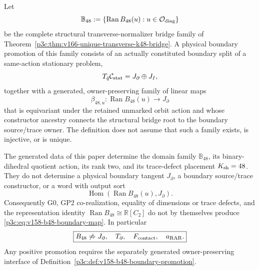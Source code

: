 \documentclass[12pt,a4paper]{article}
\begin{document}
\begin{definition}
\label{p3c:def:v158-b48-boundary-promotion}
Let
\[
 \mathbb B_{48}
 :=\{\operatorname{Ran}B_{48}(u):u\in\mathcal O_{\rm diag}\}
\]
be the complete structural transverse-normalizer bridge family of
Theorem~\ref{p3c:thm:v166-unique-transverse-k48-bridge}.  A physical boundary
promotion of this family consists of an actually constituted boundary split
of a same-action stationary problem,
\[
 T_{\bar q}\mathcal C_{\rm stat}=J_\partial\oplus J_I,
\]
together with a generated, owner-preserving family of linear maps
\begin{equation}
 \label{p3c:eq:v158-b48-boundary-map}
 \boxed{
 \beta_{48,u}:\operatorname{Ran}B_{48}(u)\longrightarrow J_\partial}
\end{equation}
that is equivariant under the retained unmarked orbit action and whose
constructor ancestry connects the structural bridge root to the boundary
source/trace owner.  The definition does not assume that such a family
exists, is injective, or is unique.
\end{definition}

\begin{theorem}
\label{p3c:thm:v158-b48-boundary-owner-nogo}
The generated data of this paper determine the domain family
\(\mathbb B_{48}\), its binary-dihedral quotient action, its rank two, and its
trace-defect placement \(K_{\rm sh}=48\).  They do not determine a physical
boundary tangent \(J_\partial\), a boundary source/trace constructor, or a
word with output sort
\[
 \operatorname{Hom}(\operatorname{Ran}B_{48}(u),J_\partial).
\]
Consequently G0, GP2 co-realization, equality of dimensions or trace defects,
and the representation identity
\(\operatorname{Ran}B_{48}\cong\mathbb R[C_2]\) do not by themselves produce
\eqref{p3c:eq:v158-b48-boundary-map}.  In particular
\begin{equation}
 \label{p3c:eq:v158-b48-no-direct-promotion}
 \boxed{
 B_{48}\not\Rightarrow
 J_\partial,\quad
 T_\partial,\quad
 F_{\rm contact},\quad
 a_{\rm RAR}.}
\end{equation}
Any positive promotion requires the separately generated owner-preserving
interface of Definition~\ref{p3c:def:v158-b48-boundary-promotion}.
\end{theorem}
\end{document}
